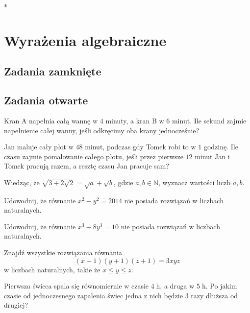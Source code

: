 *\setcounter{parc}{0}
\addtocounter{chapc}{1}

\chapter{Wyrażenia algebraiczne}

\section{Zadania zamknięte}

\section{Zadania otwarte}

\zadanie Kran A napełnia całą wannę w $4$ minuty, a kran B w $6$ minut. Ile sekund zajmie napełnienie całej wanny, jeśli odkręcimy oba krany jednocześnie?

\zadanie Jan maluje cały płot w $48$ minut, podczas gdy Tomek robi to w $1$ godzinę. Ile czasu zajmie pomalowanie całego płotu, jeśli przez pierwsze $12$ minut Jan i Tomek pracują razem, a resztę czasu Jan pracuje sam?

\zadanie Wiedząc, że $\sqrt{3 + 2\sqrt{2}} = \sqrt{a} + \sqrt{b}$, gdzie $a, b \in \mathbb{N}$, wyznacz wartości liczb $a, b$. %

\zadanie Udowodnij, że równanie $x^2 - y^2 = 2014$ nie posiada rozwiązań w liczbach naturalnych.

\zadanie Udowodnij, że równanie $x^3 - 8y^3 = 10$ nie posiada rozwiązań w liczbach naturalnych.

\zadanie Znajdź wszystkie rozwiązania równania \[{(x + 1)(y + 1)(z + 1) = 3xyz}\] w liczbach naturalnych, takie że $x \leqslant y \leqslant z$.

\zadanie Pierwsza świeca spala się równomiernie w czasie $4\;$h, a druga w $5\;$h. Po jakim czasie od jednoczesnego zapalenia świec jedna z nich będzie $3$ razy dłuższa od drugiej? %

